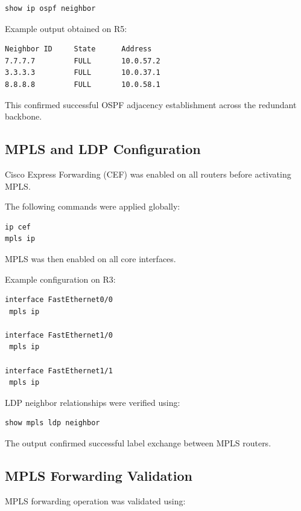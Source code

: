 \documentclass[12pt]{article}
\begin{document}
\begin{lstlisting}
show ip ospf neighbor
\end{lstlisting}

Example output obtained on R5:

\begin{lstlisting}
Neighbor ID     State      Address
7.7.7.7         FULL       10.0.57.2
3.3.3.3         FULL       10.0.37.1
8.8.8.8         FULL       10.0.58.1
\end{lstlisting}

This confirmed successful OSPF adjacency establishment across the redundant backbone.

\subsection{MPLS and LDP Configuration}

Cisco Express Forwarding (CEF) was enabled on all routers before activating MPLS.

The following commands were applied globally:

\begin{lstlisting}
ip cef
mpls ip
\end{lstlisting}

MPLS was then enabled on all core interfaces.

Example configuration on R3:

\begin{lstlisting}
interface FastEthernet0/0
 mpls ip

interface FastEthernet1/0
 mpls ip

interface FastEthernet1/1
 mpls ip
\end{lstlisting}

LDP neighbor relationships were verified using:

\begin{lstlisting}
show mpls ldp neighbor
\end{lstlisting}

The output confirmed successful label exchange between MPLS routers.

\subsection{MPLS Forwarding Validation}

MPLS forwarding operation was validated using:
\end{document}
